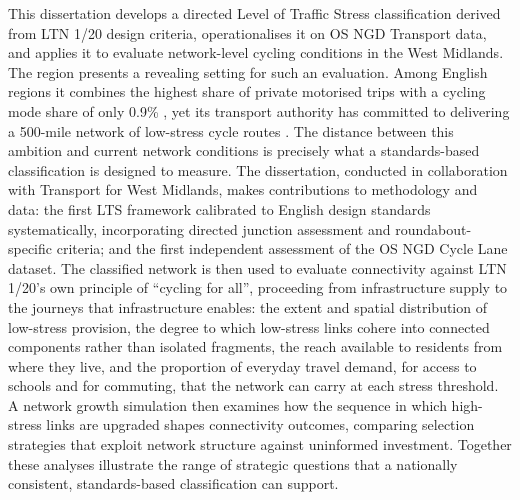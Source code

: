 This dissertation develops a directed Level of Traffic Stress classification derived from LTN 1/20 design criteria, operationalises it on OS NGD Transport data, and applies it to evaluate network-level cycling conditions in the West Midlands. The region presents a revealing setting for such an evaluation. Among English regions it combines the highest share of private motorised trips with a cycling mode share of only 0.9\% \parencite{westmidlandscombinedauthority2024}, yet its transport authority has committed to delivering a 500-mile network of low-stress cycle routes \parencite{westmidlandscombinedauthority2020}. The distance between this ambition and current network conditions is precisely what a standards-based classification is designed to measure. The dissertation, conducted in collaboration with Transport for West Midlands, makes contributions to methodology and data: the first LTS framework calibrated to English design standards systematically, incorporating directed junction assessment and roundabout-specific criteria; and the first independent assessment of the OS NGD Cycle Lane dataset. The classified network is then used to evaluate connectivity against LTN 1/20's own principle of “cycling for all”, proceeding from infrastructure supply to the journeys that infrastructure enables: the extent and spatial distribution of low-stress provision, the degree to which low-stress links cohere into connected components rather than isolated fragments, the reach available to residents from where they live, and the proportion of everyday travel demand, for access to schools and for commuting, that the network can carry at each stress threshold. A network growth simulation then examines how the sequence in which high-stress links are upgraded shapes connectivity outcomes, comparing selection strategies that exploit network structure against uninformed investment. Together these analyses illustrate the range of strategic questions that a nationally consistent, standards-based classification can support.
